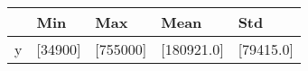 \begin{tabular}{lllll}
\toprule
{} &      Min &       Max &        Mean &        Std \\
\midrule
y &  [34900] &  [755000] &  [180921.0] &  [79415.0] \\
\bottomrule
\end{tabular}
